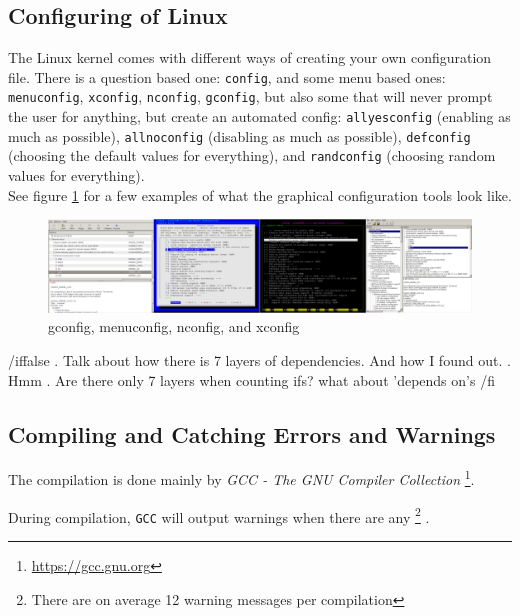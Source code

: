 \documentclass[a4paper,11pt]{report}
\newcommand{\figa}{
    \begin{figure}[!htpb]
    \centering
}
\newcommand{\figb}[2]{
    \caption{#1}
    \label{#2}
    \end{figure}
}
\begin{document}

        \subsection{Configuring of Linux}

The Linux kernel comes with different ways of creating your own configuration 
file. There is a question based one: \texttt{config}, and some menu based ones:
\texttt{menuconfig}, \texttt{xconfig}, \texttt{nconfig}, \texttt{gconfig}, 
but also some that will never prompt the user for anything, but create an 
automated config: \texttt{allyesconfig} (enabling as much as possible), 
\texttt{allnoconfig} (disabling as much as possible), \texttt{defconfig} 
(choosing the default values for everything), and \texttt{randconfig} (choosing 
random values for everything).
\\

See figure \ref{fig:lineofconfigs} for a few examples of what the graphical 
configuration tools look like.
\\


\figa
    \includegraphics[scale=0.25]{pngs/configs50percent.png}
\figb{gconfig, menuconfig, nconfig, and xconfig}{fig:lineofconfigs}


/iffalse
  . Talk about how there is 7 layers of dependencies. And how I found out.
  . Hmm . Are there only 7 layers when counting ifs? what about 
        'depends on's
/fi


\subsection{Compiling and Catching Errors and Warnings}

The compilation is done mainly by \emph{GCC - The GNU Compiler Collection}
    \footnote{\url{https://gcc.gnu.org}}.

During compilation, \texttt{GCC} will output warnings when there are any
    \footnote{There are on average 12 warning messages per compilation}
.
\end{document}
